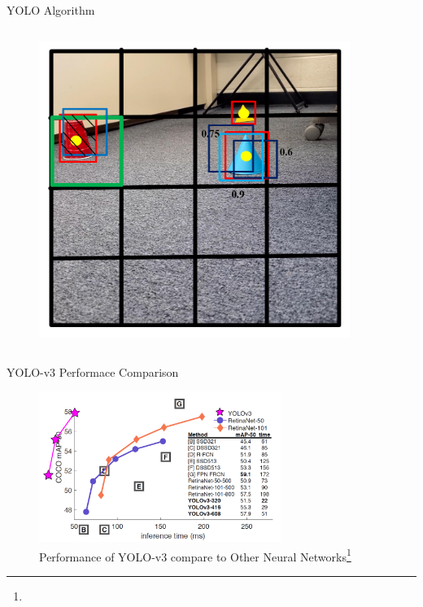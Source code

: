 \documentclass[10pt]{beamer}
\begin{document}
\begin{frame}{YOLO Algorithm}
\begin{columns}
\begin{figure}
    \includegraphics[width=0.9\textwidth]{Images/IOU.png}
\end{figure} 
\end{columns}
\end{frame}

\begin{frame}{YOLO-v3 Performace Comparison}
\begin{figure}
    \centering
    \includegraphics[width= 0.7\textwidth]{Images/yolov3time.png}
    \caption{Performance of YOLO-v3 compare to Other Neural Networks\footnote{}}
\end{figure}
\end{frame}
\end{document}
